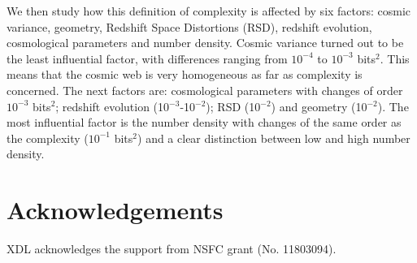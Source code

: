 \documentclass[fleqn,usenatbib]{mnras}
\begin{document}
We then study how this definition of complexity is affected by six factors: cosmic variance, geometry, Redshift Space Distortions (RSD), redshift evolution, cosmological parameters and number density. Cosmic variance turned out to be the least influential factor, with differences ranging from $10^{-4}$ to $10^{-3}$ bits$^2$. This means that the cosmic web is very homogeneous as far as complexity is concerned. The next factors are: cosmological parameters with changes of order $10^{-3}$ bits$^2$; redshift evolution (10$^{-3}$-10$^{-2}$); RSD (10$^{-2}$) and geometry (10$^{-2}$). The most influential factor is the number density with changes of the same order as the complexity ($10^{-1}$ bits$^2$) and a clear distinction between low and high number density. 

\section*{Acknowledgements}
XDL acknowledges the support from NSFC grant (No. 11803094).



\end{document}
